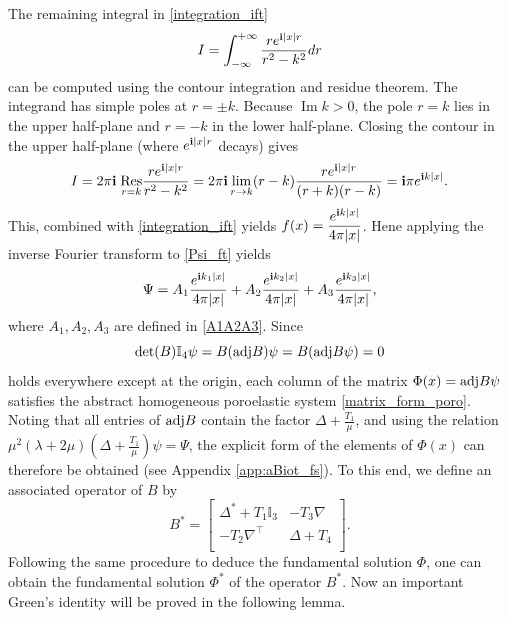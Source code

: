 \documentclass[11pt]{article}
\newcommand{\mat}{\mathbb}
\newcommand{\ds}{\displaystyle}
\newcommand{\la}{\lambda}
\begin{document}
The remaining integral in \eqref{integration_ift}
$$I = \int_{-\infty}^{+\infty}\frac{r e^{{\bf{i}}|x|r}}{r^2-k^2}dr$$
can be computed using the contour integration and residue theorem. The integrand has simple 
poles at $r=\pm k$. Because $\operatorname{Im}k>0$, the pole $r=k$ lies in the upper half-plane 
and $r=-k$ in the lower half-plane. Closing the contour in the upper half-plane 
(where $e^{{\bf{i}}|x|r}$ decays) gives
\begin{equation*}
I = 2\pi {\bf{i}}\;\underset{r=k}{\operatorname{Res}}\frac{r e^{{\bf{i}}|x|r}}{r^2-k^2}
=2\pi {\bf{i}}\lim_{r\to k}(r-k)\frac{r e^{{\bf{i}}|x|r}}{(r+k)(r-k)}={\bf{i}}\pi e^{{\bf{i}} k|x|}.
\end{equation*}
This, combined with \eqref{integration_ift} yields $f(x)=\ds \frac{e^{{\bf{i}}k\lvert x \rvert}}
{4\pi\lvert x \rvert}$. Hene
applying the inverse Fourier transform to \eqref{Psi_ft} yields 
\begin{equation*}
\Psi=A_1\frac{e^{{\bf{i}}k_1\lvert x \rvert}}{4\pi\lvert x \rvert}+A_2\frac{e^{{\bf{i}}k_2
\lvert x \rvert}}{4\pi\lvert x \rvert}+A_3\frac{e^{{\bf{i}}k_3\lvert x \rvert}}{4\pi\lvert x \rvert},
\end{equation*}
where $A_1,A_2,A_3$ are defined in \eqref{A1A2A3}.
Since 
\begin{equation*}
\det(B)\mat{I}_4\psi=B({\rm adj}B)\psi=B({\rm adj}B\psi)=0
\end{equation*}
holds everywhere except at the origin, each column of the matrix $\Phi(x)={\rm adj}B\psi$ satisfies 
the abstract homogeneous poroelastic system \eqref{matrix_form_poro}. Noting that all entries of 
${\rm adj} B$ contain the factor $\Delta+\frac{T_1}{\mu}$, and using the relation $\mu^2(\la+2\mu)
(\Delta+\frac{T_1}{\mu})\psi=\Psi$, the explicit form of the elements of $\Phi(x)$ can therefore be 
obtained (see Appendix \ref{app:aBiot_fs}). To this end, we define an associated operator of $B$ by 
\begin{equation*}
B^*=\begin{bmatrix}
\Delta^*+T_1\mat{I}_3 & -T_3\nabla \\
-T_2\nabla^{\top} & \Delta +T_4\\
\end{bmatrix}.
\end{equation*}
Following the same procedure to deduce the fundamental solution $\Phi$, one can obtain the fundamental 
solution $\Phi^*$ of the operator $B^*$. Now an important Green's identity will be proved in the following lemma.	
\end{document}
